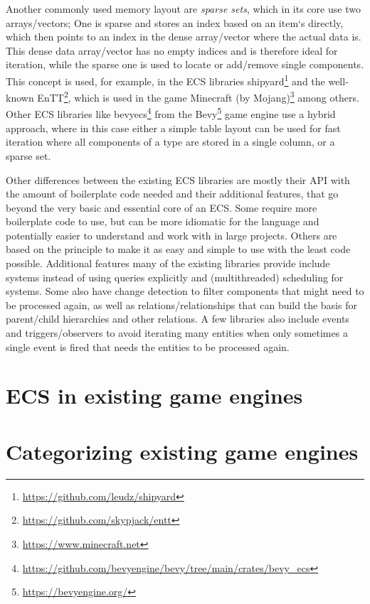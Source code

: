 Another commonly used memory layout are \textit{sparse sets}, which in its core use two arrays/vectors; One is sparse and stores an index based on an item`s directly, which then points to an index in the dense array/vector where the actual data is. This dense data array/vector has no empty indices and is therefore ideal for iteration, while the sparse one is used to locate or add/remove single components. This concept is used, for example, in the ECS libraries \textsf{shipyard}\footnote{\url{https://github.com/leudz/shipyard}} and the well-known \textsf{EnTT}\footnote{\url{https://github.com/skypjack/entt}}, which is used in the game \textsf{Minecraft} (by Mojang)\footnote{\url{https://www.minecraft.net}} among others. Other ECS libraries like \textsf{bevy\textunderscore ecs}\footnote{\url{https://github.com/bevyengine/bevy/tree/main/crates/bevy_ecs}} from the \textsf{Bevy}\footnote{\url{https://bevyengine.org/}} game engine use a hybrid approach, where in this case either a simple table layout can be used for fast iteration where all components of a type are stored in a single column, or a sparse set.

Other differences between the existing ECS libraries are mostly their API with the amount of boilerplate code needed and their additional features, that go beyond the very basic and essential core of an ECS. Some require more boilerplate code to use, but can be more idiomatic for the language and potentially easier to understand and work with in large projects. Others are based on the principle to make it as easy and simple to use with the least code possible. Additional features many of the existing libraries provide include systems instead of using queries explicitly and (multithreaded) scheduling for systems. Some also have change detection to filter components that might need to be processed again, as well as relations/relationships that can build the basis for parent/child hierarchies and other relations. A few libraries also include events and triggers/observers to avoid iterating many entities when only sometimes a single event is fired that needs the entities to be processed again.

\section{ECS in existing game engines}



\section{Categorizing existing game engines}



